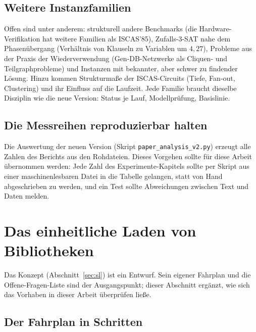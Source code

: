 \subsection{Weitere Instanzfamilien}

Offen sind unter anderem: strukturell andere Benchmarks (die Hardware-Verifikation hat weitere Familien als ISCAS'85), Zufalls-3-SAT nahe dem Phasenübergang (Verhältnis von Klauseln zu Variablen um $4{,}27$), Probleme aus der Praxis der Wiederverwendung (Gen-DB-Netzwerke als Cliquen- und Teilgraphprobleme) und Instanzen mit bekannter, aber schwer zu findender Lösung. Hinzu kommen Strukturmaße der ISCAS-Circuits (Tiefe, Fan-out, Clustering) und ihr Einfluss auf die Laufzeit. Jede Familie braucht dieselbe Disziplin wie die neue Version: Status je Lauf, Modellprüfung, Basislinie.

\subsection{Die Messreihen reproduzierbar halten}

Die Auswertung der neuen Version (Skript \texttt{paper\_analysis\_v2.py}) erzeugt alle Zahlen des Berichts aus den Rohdateien. Dieses Vorgehen sollte für diese Arbeit übernommen werden: Jede Zahl des Experimente-Kapitels sollte per Skript aus einer maschinenlesbaren Datei in die Tabelle gelangen, statt von Hand abgeschrieben zu werden, und ein Test sollte Abweichungen zwischen Text und Daten melden.

\section{Das einheitliche Laden von Bibliotheken}

Das Konzept (Abschnitt~\ref{sec:sl}) ist ein Entwurf. Sein eigener Fahrplan und die Offene-Fragen-Liste sind der Ausgangspunkt; dieser Abschnitt ergänzt, wie sich das Vorhaben in dieser Arbeit überprüfen ließe.

\subsection{Der Fahrplan in Schritten}

